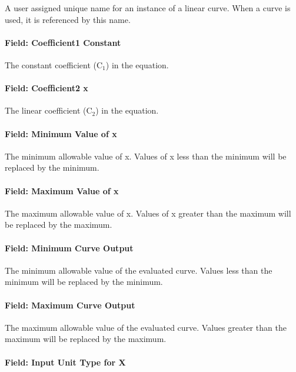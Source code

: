 A user assigned unique name for an instance of a linear curve. When a curve is used, it is referenced by this name.

\paragraph{Field: Coefficient1 Constant}\label{field-coefficient1-constant}

The constant coefficient (C\(_{1}\)) in the equation.

\paragraph{Field: Coefficient2 x}\label{field-coefficient2-x}

The linear coefficient (C\(_{2}\)) in the equation.

\paragraph{Field: Minimum Value of x}\label{field-minimum-value-of-x}

The minimum allowable value of x. Values of x less than the minimum will be replaced by the minimum.

\paragraph{Field: Maximum Value of x}\label{field-maximum-value-of-x}

The maximum allowable value of x. Values of x greater than the maximum will be replaced by the maximum.

\paragraph{Field: Minimum Curve Output}\label{field-minimum-curve-output}

The minimum allowable value of the evaluated curve. Values less than the minimum will be replaced by the minimum.

\paragraph{Field: Maximum Curve Output}\label{field-maximum-curve-output}

The maximum allowable value of the evaluated curve. Values greater than the maximum will be replaced by the maximum.

\paragraph{Field: Input Unit Type for X}\label{field-input-unit-type-for-x}

